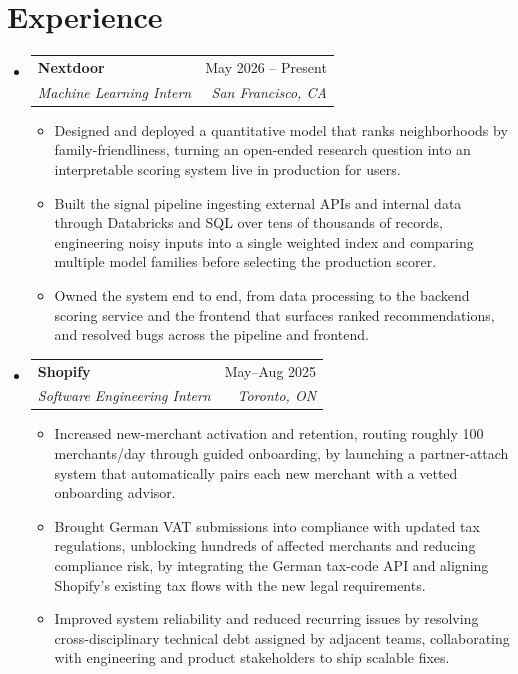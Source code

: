 \documentclass[letterpaper,11pt]{article}
\makeatletter
\newcommand{\resumeItem}[1]{
  \item\small{
    {#1 \vspace{-3pt}}
  }
}
\newcommand{\resumeSubheading}[4]{
  \vspace{-2pt}\item
    \begin{tabular*}{0.97\textwidth}[t]{l@{\extracolsep{\fill}}r}
      \textbf{#1} & #2 \\
      \textit{\small#3} & \textit{\small #4} \\
    \end{tabular*}\vspace{-5pt}
}
\newcommand{\resumeSubHeadingListStart}{\begin{itemize}[leftmargin=0.15in, label={}]}
\newcommand{\resumeSubHeadingListEnd}{\end{itemize}}
\newcommand{\resumeItemListStart}{\begin{itemize}}
\newcommand{\resumeItemListEnd}{\end{itemize}\vspace{-7pt}}
\makeatother
\begin{document}
\section{Experience}
  \resumeSubHeadingListStart
    \resumeSubheading
      {Nextdoor}{May 2026 -- Present}
      {Machine Learning Intern}{San Francisco, CA}
      \resumeItemListStart
        \resumeItem{Designed and deployed a quantitative model that ranks neighborhoods by family-friendliness, turning an open-ended research question into an interpretable scoring system live in production for users.}
        \resumeItem{Built the signal pipeline ingesting external APIs and internal data through Databricks and SQL over tens of thousands of records, engineering noisy inputs into a single weighted index and comparing multiple model families before selecting the production scorer.}
        \resumeItem{Owned the system end to end, from data processing to the backend scoring service and the frontend that surfaces ranked recommendations, and resolved bugs across the pipeline and frontend.}
      \resumeItemListEnd
    \resumeSubheading
      {Shopify}{May--Aug 2025}
      {Software Engineering Intern}{Toronto, ON}
      \resumeItemListStart
        \resumeItem{Increased new-merchant activation and retention, routing roughly 100 merchants/day through guided onboarding, by launching a partner-attach system that automatically pairs each new merchant with a vetted onboarding advisor.}
        \resumeItem{Brought German VAT submissions into compliance with updated tax regulations, unblocking hundreds of affected merchants and reducing compliance risk, by integrating the German tax-code API and aligning Shopify's existing tax flows with the new legal requirements.}
        \resumeItem{Improved system reliability and reduced recurring issues by resolving cross-disciplinary technical debt assigned by adjacent teams, collaborating with engineering and product stakeholders to ship scalable fixes.}
      \resumeItemListEnd
  \resumeSubHeadingListEnd
\end{document}
